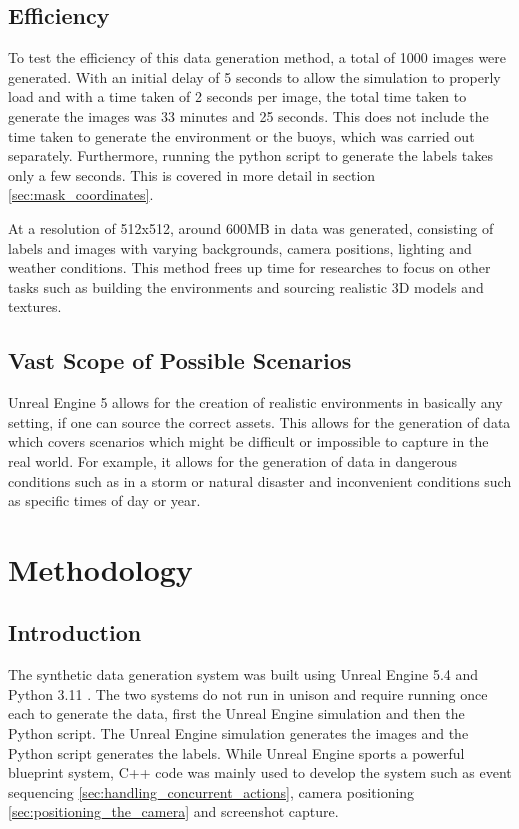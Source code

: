 \documentclass[10pt,twocolumn,letterpaper]{article}
\begin{document}
\subsection{Efficiency}

To test the efficiency of this data generation method, a total of 1000 images were generated. With an initial delay of 5 seconds to allow the simulation to properly load and with a time taken of 2 seconds per image, the total time taken to generate the images was 33 minutes and 25 seconds. This does not include the time taken to generate the environment or the buoys, which was carried out separately. Furthermore, running the python script to generate the labels takes only a few seconds. This is covered in more detail in section \ref{sec:mask_coordinates}.

At a resolution of 512x512, around 600MB in data was generated, consisting of labels and images with varying backgrounds, camera positions, lighting and weather conditions. This method frees up time for researches to focus on other tasks such as building the environments and sourcing realistic 3D models and textures. 

\subsection{Vast Scope of Possible Scenarios}

Unreal Engine 5 allows for the creation of realistic environments in basically any setting, if one can source the correct assets. This allows for the generation of data which covers scenarios which might be difficult or impossible to capture in the real world. For example, it allows for the generation of data in dangerous conditions such as in a storm or natural disaster and inconvenient conditions such as specific times of day or year.

\section{Methodology}

\subsection{Introduction}

The synthetic data generation system was built using Unreal Engine 5.4 \cite{EpicGames2024} and Python 3.11 \cite{PythonSoftwareFoundation2022}. The two systems do not run in unison and require running once each to generate the data, first the Unreal Engine simulation and then the Python script. The Unreal Engine simulation generates the images and the Python script generates the labels. While Unreal Engine sports a powerful blueprint system, C++ code was mainly used to develop the system such as event sequencing \ref{sec:handling_concurrent_actions}, camera positioning \ref{sec:positioning_the_camera} and screenshot capture.
\end{document}
